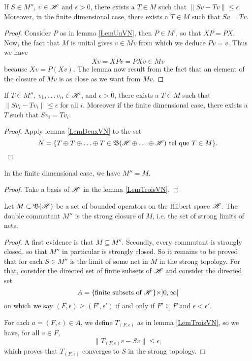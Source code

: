 \begin{lemma}		\label{LemDeuxVN}
If $S\in M''$, $v\in \mathscr{H}$ and $\epsilon >0$, there exists a $T\in M$ such that $\| Sv-Tv \|\leq\epsilon$. Moreover, in the finite dimensional case, there exists a $T\in M$ such that $Sv=Tv$.
\end{lemma}

\begin{proof}
Consider $P$ as in lemma \ref{LemUnVN}, then $P\in M'$, so that $XP=PX$. Now, the fact that $M$ is unital gives $v\in \overline{ Mv }$ from which we deduce $Pv=v$. Thus we have
\[ 
  Xv=XPv=PXv\in\overline{ Mv }
\]
because $Xv=P(Xv)$. The lemma now result from the fact that an element of the closure of $Mv$ is as close as we want from $Mv$.
\end{proof}

\begin{lemma}		\label{LemTroisVN}
If $T\in M''$, $v_1, \ldots v_n\in\mathscr{H}$, and $\epsilon>0$, there exists a $T\in M$ such that $\| Sv_i-Tv_i \|\leq\epsilon$ for all $i$. Moreover if the finite dimensional case, there exists a $T$ such that $Sv_i=Tv_i$.
\end{lemma}

\begin{proof}
Apply lemma \ref{LemDeuxVN} to the set
\[ 
  N=\{ T\oplus T\oplus\ldots\oplus T\in\mathfrak{B}(\mathscr{H}\oplus\ldots\oplus\mathscr{H})\text{ tel que } T\in M \}.
\]
\end{proof}

\begin{corollary}
In the finite dimensional case, we have $M''=M$.
\end{corollary}

\begin{proof}
Take a basis of $\mathscr{H}$ in the lemma \ref{LemTroisVN}.
\end{proof}

\begin{theorem}		\label{ThoDoubleCommutant}
	Let $M\subset\mathfrak{B}(\mathscr{H})$ be a set of bounded operators on the Hilbert space $\mathscr{H}$. The double commutant $M''$ is the strong closure of $M$, i.e. the set of strong limits of nets.
\end{theorem}

\begin{proof}
A first evidence is that $M\subseteq M''$. Secondly, every commutant is strongly closed, so that $M''$ in particular is strongly closed. So it remains to be proved that for each $S\in M''$ is the limit of some net in $M$ in the strong topology. For that, consider the directed set of finite subsets of $\mathscr{H}$ and consider the directed set
\[ 
  A=\{ \text{finite subsets of $\mathscr{H}$} \}\times ]0,\infty[
\]
on which we say $(F,\epsilon)\geq (F',\epsilon')$ if and only if $F'\subseteq F$ and $\epsilon <\epsilon'$.

For each $a=(F,\epsilon)\in A$, we define $T_{(F,\epsilon)}$ as in lemma \ref{LemTroisVN}, so we have, for all $v\in F$,
\[ 
  \| T_{(F,\epsilon)}v-Sv \|\leq\epsilon,
\]
which proves that $T_{(F,\epsilon)}$ converges to $S$ in the strong topology.
\end{proof}


